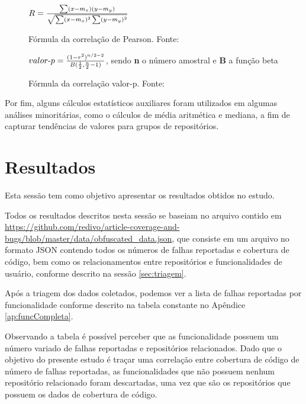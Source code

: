 \documentclass[11.5pt]{article}
\begin{document}
\begin{figure}[ht]
\label{fig:formulaCorrelacao}
\begin{center}
    $R = {\sum(x - m_x)(y - m_y) \over \sqrt{\sum(x - m_x)^2 \sum(y - m_y)^2}}$
\end{center}
\caption{Fórmula da correlação de Pearson. Fonte: \cite{scipy}}
\end{figure}

\begin{figure}[ht]
\label{fig:formulaValorP}
\begin{center}
    $valor\mbox{-}p = { (1 - r^2)^{n/2-2} \over B({1 \over 2}, {n \over 2} - 1) }$,
    sendo \textbf{n} o número amostral e \textbf{B} a função beta
\end{center}
\caption{Fórmula da correlação valor-p. Fonte: \cite{scipy}}
\end{figure}

Por fim, alguns cálculos estatísticos auxiliares foram utilizados em algumas análises minoritárias,
como o cálculos de média aritmética e mediana, a fim de capturar
tendências de valores para grupos de repositórios.




\section{Resultados} \label{sec:resultados}

Esta sessão tem como objetivo apresentar os resultados obtidos no estudo.

Todos os resultados descritos nesta sessão se baseiam no arquivo contido em
\url{https://github.com/redivo/article-coverage-and-bugs/blob/master/data/obfuscated_data.json},
que consiste em um arquivo no formato JSON contendo todos os números de
falhas reportadas e cobertura de código, bem como os relacionamentos entre repositórios e
funcionalidades de usuário, conforme descrito na sessão \ref{sec:triagem}.

Após a triagem dos dados coletados, podemos ver a lista de falhas reportadas por funcionalidade
conforme descrito na tabela constante no Apêndice \ref{ap:funcCompleta}.

Observando a tabela é possível perceber que as funcionalidade possuem um número variado de falhas
reportadas e repositórios relacionados.
Dado que o objetivo do presente estudo é traçar uma correlação entre cobertura de código de número
de falhas reportadas, as funcionalidades que não possuem nenhum repositório relacionado foram
descartadas, uma vez que são os repositórios que possuem os dados de cobertura de código.
\end{document}
